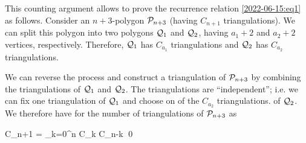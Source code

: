 This counting argument allows to prove the recurrence relation \eqref{2022-06-15:eq1} as follows. Consider an $n+3$-polygon $\mathcal{P}_{n+3}$ (having $C_{n+1}$ triangulations). We can split this polygon into two polygons $\mathcal{Q}_1$ and $\mathcal{Q}_2$, having $a_1+2$ and $a_2+2$ vertices, respectively. Therefore, $\mathcal{Q}_1$ has $C_{a_1}$ triangulations and  $\mathcal{Q}_2$ has $C_{a_2}$ triangulations.

We can reverse the process and construct a triangulation of $\mathcal{P}_{n+3}$ by combining the triangulations of $\mathcal{Q}_1$ and $\mathcal{Q}_2$. The triangulations are ``independent''; i.e. we can fix one triangulation of $\mathcal{Q}_1$ and choose on of the $C_{a_2}$ triangulations. of $\mathcal{Q}_2$. We therefore have for the number of triangulations of $\mathcal{P}_{n+3}$ as

\bee
C_{n+1} = \sum_{k=0}^n C_k C_{n-k} \qed
\eee




